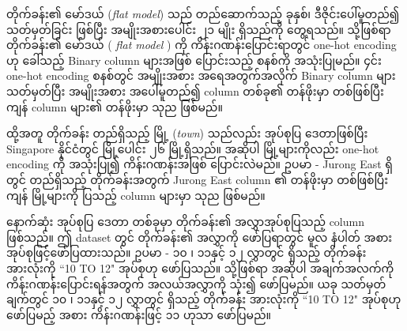 တိုက်ခန်း၏ မော်ဒယ် (\textit{flat model}) သည် တည်ဆောက်သည့် ခုနှစ်၊ ဒီဇိုင်းပေါ်မူတည်၍ သတ်မှတ်ခြင်း ဖြစ်ပြီး အမျိုးအစားပေါင်း ၂၁ မျိုး ရှိသည်ကို တွေ့ရသည်။  သို့ဖြစ်ရာ တိုက်ခန်း၏ မော်ဒယ် ( \textit{flat model}  ) ကို ကိန်းဂဏန်းပြောင်းရာတွင် one-hot encoding ဟု ခေါ်သည့် Binary column များအဖြစ် ပြောင်းသည့် စနစ်ကို အသုံးပြုမည်။ ၄င်း one-hot encoding စနစ်တွင် အမျိုးအစား အရေအတွက်အလိုက် Binary column များ သတ်မှတ်ပြီး အမျိုးအစား အပေါ်မူတည်၍ column တစ်ခု၏ တန်ဖိုးမှာ တစ်ဖြစ်ပြီး ကျန် column များ၏ တန်ဖိုးမှာ သုည ဖြစ်မည်။ 

ထို့အတူ တိုက်ခန်း တည်ရှိသည့် မြို့ (\textit{town}) သည်လည်း အုပ်စုပြ ဒေတာဖြစ်ပြီး Singapore နိုင်ငံတွင် မြို့ပေါင်း ၂၆ မြို့ရှိသည်။ အဆိုပါ မြို့များကိုလည်း one-hot encoding ကို အသုံးပြု၍ ကိန်းဂဏန်းအဖြစ် ပြောင်းလဲမည်။ ဥပမာ - Jurong East ရှိတွင် တည်ရှိသည့် တိုက်ခန်းအတွက် Jurong East column ၏ တန်ဖိုးမှာ တစ်ဖြစ်ပြီး ကျန် မြို့များကို ပြသည့် column များမှာ သုည ဖြစ်မည်။ 

နောက်ဆုံး အုပ်စုပြ ဒေတာ တစ်ခုမှာ တိုက်ခန်း၏ အလွှာအုပ်စုပြသည့် column ဖြစ်သည်။ ဤ dataset တွင် တိုက်ခန်း၏ အလွှာကို ဖော်ပြရာတွင် မူလ နံပါတ် အစား အုပ်စုဖြင့်ဖော်ပြထားသည်။ ဥပမာ - ၁၀ ၊ ၁၁နှင့် ၁၂ လွှာတွင် ရှိသည့် တိုက်ခန်း အားလုံးကို ``10 TO 12" အုပ်စုဟု ဖော်ပြသည်။ သို့ဖြစ်ရာ အဆိုပါ အချက်အလက်ကို ကိန်းဂဏန်းပြောင်းရန်အတွက် အလယ်အလွှာကို သုံး၍ ဖော်ပြမည်။ ယခု သတ်မှတ်ချက်တွင် ၁၀ ၊ ၁၁နှင့် ၁၂ လွှာတွင် ရှိသည့် တိုက်ခန်း အားလုံးကို ``10 TO 12" အုပ်စုဟု ဖော်ပြမည့် အစား ကိန်းဂဏန်းဖြင့် ၁၁ ဟုသာ ဖော်ပြမည်။ 

